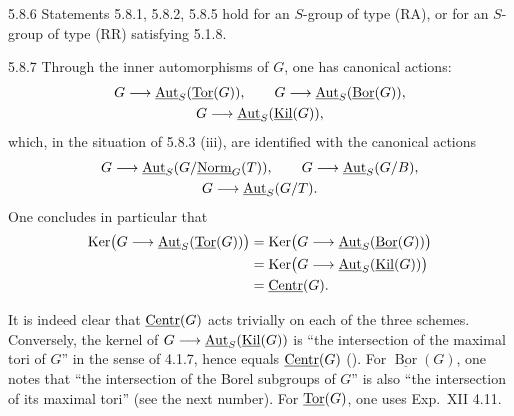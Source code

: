 \begin{remark}{5.8.6}\label{XXII.5.8.6}
Statements 5.8.1, 5.8.2, 5.8.5 hold for an $S$-group of type (RA), or for an $S$-group of type (RR) satisfying 5.1.8.{\renewcommand{\thefootnote}{(55)}}
\end{remark}
\begin{remark}{5.8.7}\label{XXII.5.8.7}
Through the inner automorphisms of $G$, one has canonical actions:
\[
\begin{gathered}
G\longrightarrow\underline{\operatorname{Aut}}_S(\underline{\operatorname{Tor}}(G)),\qquad
G\longrightarrow\underline{\operatorname{Aut}}_S(\underline{\operatorname{Bor}}(G)),\\
G\longrightarrow\underline{\operatorname{Aut}}_S(\underline{\operatorname{Kil}}(G)),
\end{gathered}
\]
which, in the situation of 5.8.3 (iii), are identified with the canonical actions
\[
\begin{gathered}
G\longrightarrow\underline{\operatorname{Aut}}_S(G/\underline{\mathrm{Norm}}_G(T)),\qquad G\longrightarrow\underline{\operatorname{Aut}}_S(G/B),\\
G\longrightarrow\underline{\operatorname{Aut}}_S(G/T).
\end{gathered}
\]
One concludes in particular that
\[
\begin{aligned}
\operatorname{Ker}\bigl(G\longrightarrow\underline{\operatorname{Aut}}_S(\underline{\operatorname{Tor}}(G))\bigr)
&=\operatorname{Ker}\bigl(G\longrightarrow\underline{\operatorname{Aut}}_S(\underline{\operatorname{Bor}}(G))\bigr)\\
&=\operatorname{Ker}\bigl(G\longrightarrow\underline{\operatorname{Aut}}_S(\underline{\operatorname{Kil}}(G))\bigr)\\
&=\underline{\mathrm{Centr}}(G).
\end{aligned}
\]
\end{remark}
It is indeed clear that $\underline{\mathrm{Centr}}(G)$ acts trivially on each of the three schemes. Conversely, the kernel of $G\longrightarrow\underline{\operatorname{Aut}}_S(\underline{\operatorname{Kil}}(G))$ is ``the intersection of the maximal tori of $G$'' in the sense of 4.1.7, hence equals $\underline{\mathrm{Centr}}(G)$ (\loccit). For $\underline{\operatorname{Bor}}(G)$, one notes that ``the intersection of the Borel subgroups of $G$'' is also ``the intersection of its maximal tori'' (see the next number). For $\underline{\operatorname{Tor}}(G)$, one uses Exp.~XII 4.11.


